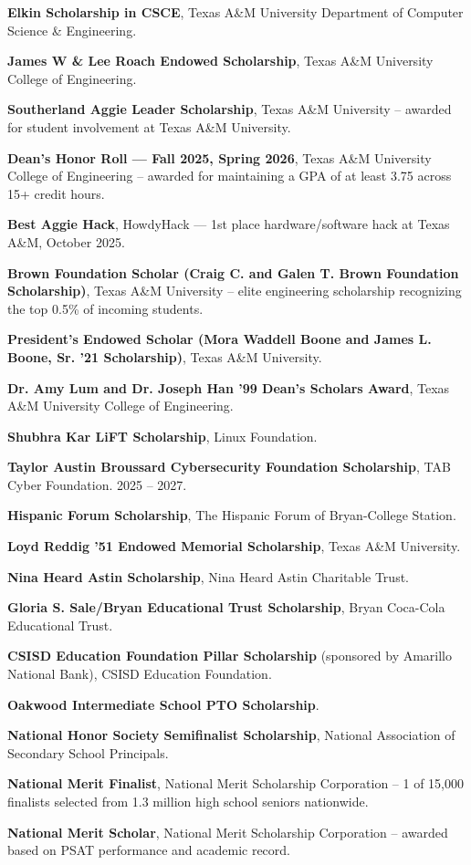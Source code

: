 \documentclass[letterpaper,11pt]{article}
\newcommand{\resumeItem}[1]{
  \item\small{
    {#1 \vspace{-2pt}}
  }
}
\begin{document}
      \resumeItem{\textbf{Elkin Scholarship in CSCE}, Texas A\&M University Department of Computer Science \& Engineering.}
      \resumeItem{\textbf{James W \& Lee Roach Endowed Scholarship}, Texas A\&M University College of Engineering.}
      \resumeItem{\textbf{Southerland Aggie Leader Scholarship}, Texas A\&M University -- awarded for student involvement at Texas A\&M University.}
      \resumeItem{\textbf{Dean's Honor Roll --- Fall 2025, Spring 2026}, Texas A\&M University College of Engineering -- awarded for maintaining a GPA of at least 3.75 across 15+ credit hours.}
      \resumeItem{\textbf{Best Aggie Hack}, HowdyHack --- 1st place hardware/software hack at Texas A\&M, October 2025.}
      \resumeItem{\textbf{Brown Foundation Scholar (Craig C. and Galen T. Brown Foundation Scholarship)}, Texas A\&M University -- elite engineering scholarship recognizing the top 0.5\% of incoming students.}
      \resumeItem{\textbf{President's Endowed Scholar (Mora Waddell Boone and James L. Boone, Sr. '21 Scholarship)}, Texas A\&M University.}
      \resumeItem{\textbf{Dr. Amy Lum and Dr. Joseph Han '99 Dean's Scholars Award}, Texas A\&M University College of Engineering.}
      \resumeItem{\textbf{Shubhra Kar LiFT Scholarship}, Linux Foundation.}
      \resumeItem{\textbf{Taylor Austin Broussard Cybersecurity Foundation Scholarship}, TAB Cyber Foundation. 2025 -- 2027.}
      \resumeItem{\textbf{Hispanic Forum Scholarship}, The Hispanic Forum of Bryan-College Station.}
      \resumeItem{\textbf{Loyd Reddig '51 Endowed Memorial Scholarship}, Texas A\&M University.}
      \resumeItem{\textbf{Nina Heard Astin Scholarship}, Nina Heard Astin Charitable Trust.}
      \resumeItem{\textbf{Gloria S. Sale/Bryan Educational Trust Scholarship}, Bryan Coca-Cola Educational Trust.}
      \resumeItem{\textbf{CSISD Education Foundation Pillar Scholarship} (sponsored by Amarillo National Bank), CSISD Education Foundation.}
      \resumeItem{\textbf{Oakwood Intermediate School PTO Scholarship}.}
      \resumeItem{\textbf{National Honor Society Semifinalist Scholarship}, National Association of Secondary School Principals.}
      \resumeItem{\textbf{National Merit Finalist}, National Merit Scholarship Corporation -- 1 of 15,000 finalists selected from 1.3 million high school seniors nationwide.}
      \resumeItem{\textbf{National Merit Scholar}, National Merit Scholarship Corporation -- awarded based on PSAT performance and academic record.}
\end{document}

